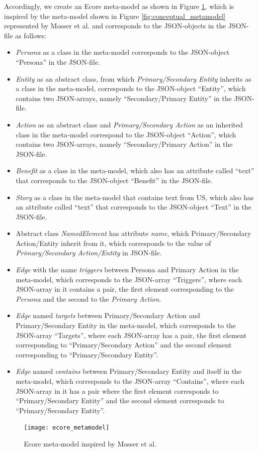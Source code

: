 Accordingly, we create an Ecore meta-model as shown in Figure \ref{fig:design_ecore_meta_model}, which is inspired by the meta-model shown in Figure \ref{fig:conceptual_metamodel} represented by Mosser et al. and corresponds to the JSON-objects in the JSON-file as follows:
\begin{itemize}
	\item \textit{Persona} as a class in the meta-model corresponds to the JSON-object \enquote{Persona} in the JSON-file.
	\item \textit{Entity} as an abstract class, from which \textit{Primary/Secondary Entity} inherits as a class in the meta-model, corresponds to the JSON-object \enquote{Entity}, which contains two JSON-arrays, namely \enquote{Secondary/Primary Entity} in the JSON-file.
	\item \textit{Action} as an abstract class and \textit{Primary/Secondary Action} as an inherited class in the meta-model correspond to the JSON-object \enquote{Action}, which contains two JSON-arrays, namely \enquote{Secondary/Primary Action} in the JSON-file.
	\item \textit{Benefit} as a class in the meta-model, which also has an attribute called \enquote{text} that corresponds to the JSON-object \enquote{Benefit} in the JSON-file.
	\item \textit{Story} as a class in the meta-model that contains text from US, which also has an attribute called \enquote{text} that corresponds to the JSON-object \enquote{Text} in the JSON-file.
	\item Abstract class \textit{NamedElement} has attribute \textit{name}, which Primary/Secondary Action/Entity inherit from it, which corresponds to the value of \textit{Primary/Secondary Action/Entity} in JSON-file.
	\item \textit{Edge} with the name \textit{triggers} between Persona and Primary Action in the meta-model, which corresponds to the JSON-array \enquote{Triggers}, where each JSON-array in it contains a pair, the first element corresponding to the \textit{Persona} and the second to the \textit{Primary Action}.
	\item \textit{Edge} named \textit{targets} between Primary/Secondary Action and Primary/Secondary Entity in the meta-model, which corresponds to the JSON-array \enquote{Targets}, where each JSON-array has a pair, the first element corresponding to \enquote{Primary/Secondary Action} and the second element corresponding to \enquote{Primary/Secondary Entity}.
	\item \textit{Edge} named \textit{contains} between Primary/Secondary Entity and itself in the meta-model, which corresponds to the JSON-array \enquote{Contains}, where each JSON-array in it has a pair where the first element corresponds to \enquote{Primary/Secondary Entity} and the second element corresponds to \enquote{Primary/Secondary Entity}.
\end{itemize}
\begin{figure}[h]
	\centering
	\texttt{[image: ecore\_metamodel]}
	\caption{Ecore meta-model inspired by Mosser et al. \cite{mosser2022modelling}}\label{fig:design_ecore_meta_model}
\end{figure}
